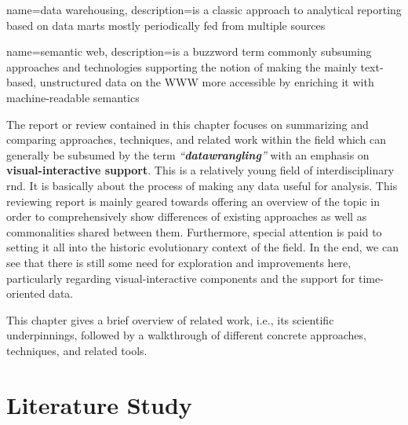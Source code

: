 
{
  name={data warehousing},
  description={is a classic approach to analytical reporting based on data marts mostly periodically fed from multiple sources}
}

{
  name={semantic web},
  description={is a buzzword term commonly subsuming approaches and technologies supporting the notion of making the mainly text-based, unstructured data on the \textsc{WWW} more accessible by enriching it with machine-readable semantics}
}


The report or review contained in this chapter focuses on summarizing and comparing approaches, techniques, and related work within the field which can generally be subsumed by the term \emph{``\textbf{\gls{datawrangling}}''} with an emphasis on \textbf{visual-interactive support}.
This is a relatively young field of interdisciplinary \gls{rnd}.
It is basically about the process of making any data useful for analysis.
This reviewing report is mainly geared towards offering an overview of the topic in order to comprehensively show differences of existing approaches as well as commonalities shared between them.
Furthermore, special attention is paid to setting it all into the historic evolutionary context of the field.
In the end, we can see that there is still some need for exploration and improvements here, particularly regarding visual-interactive components and the support for time-oriented data.

This chapter gives a brief overview of related work, i.e., its scientific underpinnings, followed by a walkthrough of different concrete approaches, techniques, and related tools.

\section{Literature Study}

